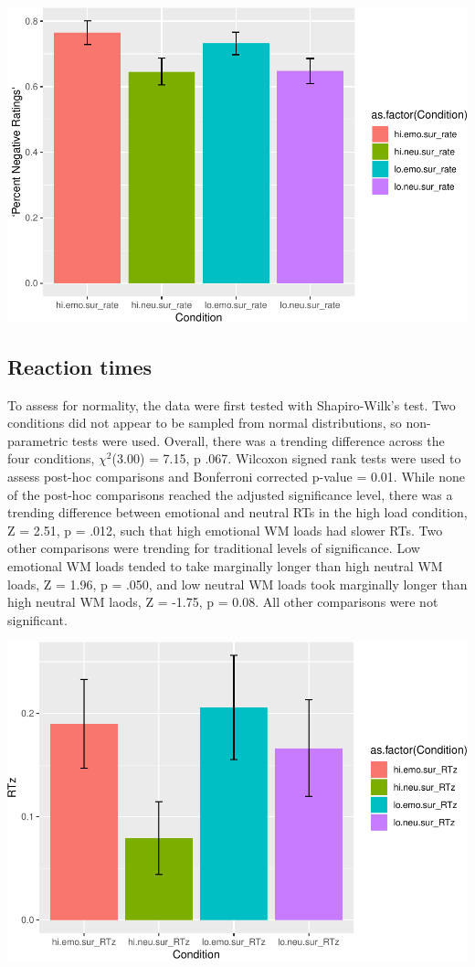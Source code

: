 \documentclass[man]{apa6}
\begin{document}
\includegraphics{Manuscript_files/figure-latex/plot figure 1-1.pdf}

\hypertarget{reaction-times}{%
\subsection{Reaction times}\label{reaction-times}}

To assess for normality, the data were first tested with Shapiro-Wilk's test. Two conditions did not appear to be sampled from normal distributions, so non-parametric tests were used. Overall, there was a trending difference across the four conditions, \(\chi^{2}\)(3.00) = 7.15, p .067. Wilcoxon signed rank tests were used to assess post-hoc comparisons and Bonferroni corrected p-value = 0.01. While none of the post-hoc comparisons reached the adjusted significance level, there was a trending difference between emotional and neutral RTs in the high load condition, Z = 2.51, p = .012, such that high emotional WM loads had slower RTs. Two other comparisons were trending for traditional levels of significance. Low emotional WM loads tended to take marginally longer than high neutral WM loads, Z = 1.96, p = .050, and low neutral WM loads took marginally longer than high neutral WM laods, Z = -1.75, p = 0.08. All other comparisons were not significant.

\includegraphics{Manuscript_files/figure-latex/plot RT data-1.pdf}
\end{document}
